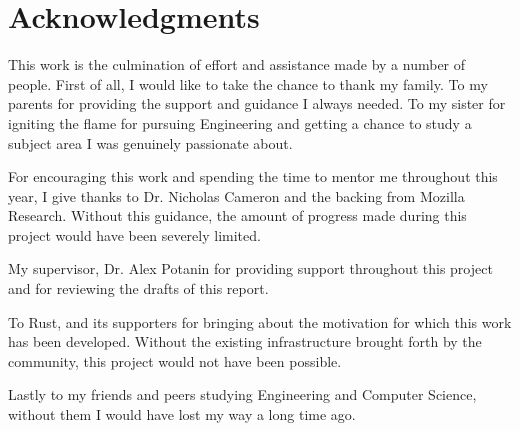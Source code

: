 \chapter*{Acknowledgments}\label{C:ack} 

This work is the culmination of effort and assistance made by a number of people. First of all, I would like to take the chance to thank my family. To my parents for providing the support and guidance I always needed. To my sister for igniting the flame for pursuing Engineering and getting a chance to study a subject area I was genuinely passionate about.

For encouraging this work and spending the time to mentor me throughout this year, I give thanks to Dr. Nicholas Cameron and the backing from Mozilla Research. Without this guidance, the amount of progress made during this project would have been severely limited.

My supervisor, Dr. Alex Potanin for providing support throughout this project and for reviewing the drafts of this report.

To Rust, and its supporters for bringing about the motivation for which this work has been developed. Without the existing infrastructure brought forth by the community, this project would not have been possible.

Lastly to my friends and peers studying Engineering and Computer Science, without them I would have lost my way a long time ago.